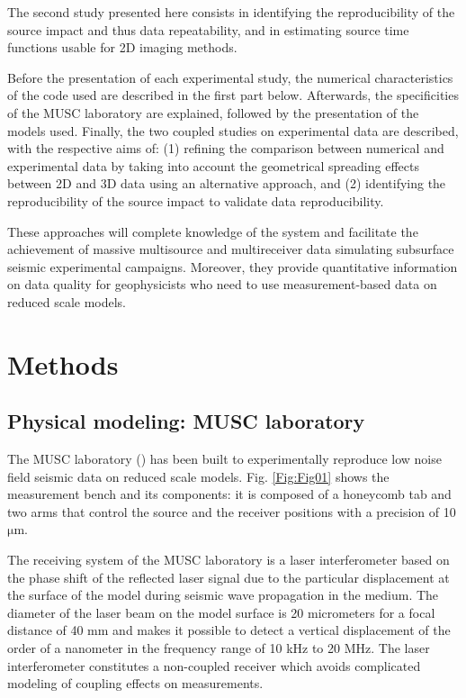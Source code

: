 \documentclass[extra,mreferee]{gji}
\begin{document}
The second study presented here consists in identifying the reproducibility of the source impact and thus data repeatability, and in estimating source time functions usable for 2D imaging methods.

Before the presentation of each experimental study, the numerical characteristics of the code used are described in the first part below. Afterwards, the specificities of the MUSC laboratory are explained, followed by the presentation of the models used. Finally, the two coupled studies on experimental data are described, with the respective aims of: (1) refining the comparison between numerical and experimental data by taking into account the geometrical spreading effects between 2D and 3D data using an alternative approach, and (2) identifying the reproducibility of the source impact to validate data reproducibility.

These approaches will complete knowledge of the system and facilitate the achievement of massive multisource and multireceiver data simulating subsurface seismic experimental campaigns. Moreover, they provide quantitative information on data quality for geophysicists who need to use measurement-based data on reduced scale models. 

\section{Methods}

 


\subsection{Physical modeling: MUSC laboratory}

The MUSC laboratory (\cite{Bretaudeau_SSA_2008b,Bretaudeau_SSM_2011,Bretaudeau_FWI_2013}) has been built to experimentally reproduce low noise field seismic data on reduced scale models. Fig. \ref{Fig:Fig01} shows the measurement bench and its components: it is composed of a honeycomb tab and two arms that control the source and the receiver positions with a precision of 10 $\mathrm{\mu m}$.

The receiving system of the MUSC laboratory is a laser interferometer based on the phase shift of the reflected laser signal due to the particular displacement at the surface of the model during seismic wave propagation in the medium. The diameter of the laser beam on the model surface is 20 micrometers for a focal distance of 40 mm and makes it possible to detect a vertical displacement of the order of a nanometer in the frequency range of 10 kHz to 20 MHz. The laser interferometer constitutes a non-coupled receiver which avoids complicated modeling of coupling effects on measurements.
\end{document}
